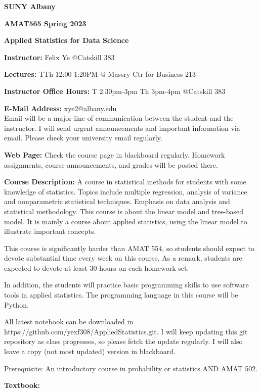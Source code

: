 \documentclass[a4paper,10pt]{article}
\begin{document}
\begin{center}

\textbf{SUNY Albany}

\textbf{AMAT565 Spring 2023}

\textbf{Applied Statistics for Data Science}


\end{center}

\textbf{Instructor:} Felix Ye @Catskill 383 

\textbf{Lectures:} TTh 12:00-1:20PM  @ Massry Ctr for Business 213

\textbf{Instructor Office Hours:}   T 2:30pm-3pm  Th 3pm-4pm @Catskill 383


\textbf{E-Mail Address:} xye2@albany.edu\\
Email will be a major line of communication between the student and the instructor. I will send urgent announcements and important information via email. Please check your university email regularly.

\textbf{Web Page:}
Check the course page in blackboard regularly. Homework assignments, course announcements, and grades will be posted there.


\textbf{Course Description:} 	
A course in statistical methods for students with some knowledge of statistics. Topics include multiple regression, analysis of variance and nonparametric statistical techniques. Emphasis on data analysis and statistical methodology.  
This course is about the linear model and tree-based model. It is mainly a course about applied statistics, using the linear model to illustrate important concepts.

This course is significantly harder than AMAT 554, so students should expect to devote substantial time every week on this course. As a remark, students are expected to devote at least 30 hours on each homework set. 

In addition, the students will practice basic programming skills to use software tools in applied statistics. The programming language in this course will be Python. 

All latest notebook can be downloaded in https://github.com/yexf308/AppliedStatistics.git. I will keep updating this git repository as class progresses, so please fetch the update regularly. I will also leave a copy (not most updated) version in blackboard. 

 Prerequisite: An introductory course in probability or statistics AND AMAT 502.
 

\textbf{Textbook:} 
\end{document}
